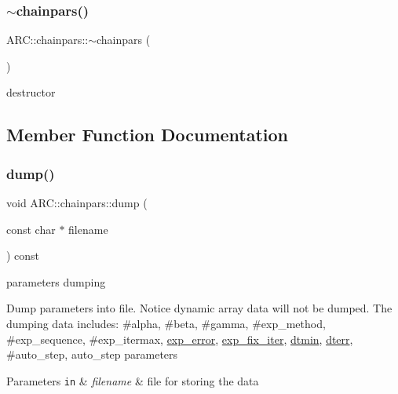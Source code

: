 \subsubsection{\texorpdfstring{$\sim$chainpars()}{~chainpars()}}
{\footnotesize\ttfamily A\+R\+C\+::chainpars\+::$\sim$chainpars (\begin{DoxyParamCaption}{ }\end{DoxyParamCaption})\hspace{0.3cm}{\ttfamily [inline]}}



destructor 



\subsection{Member Function Documentation}
\hypertarget{classARC_1_1chainpars_a926438a652307d24bd8a03b0ca926382}{}\label{classARC_1_1chainpars_a926438a652307d24bd8a03b0ca926382} 
\subsubsection{\texorpdfstring{dump()}{dump()}}
{\footnotesize\ttfamily void A\+R\+C\+::chainpars\+::dump (\begin{DoxyParamCaption}\item[{const char $\ast$}]{filename }\end{DoxyParamCaption}) const\hspace{0.3cm}{\ttfamily [inline]}}



parameters dumping 

Dump parameters into file. Notice dynamic array data will not be dumped. The dumping data includes\+: \#alpha, \#beta, \#gamma, \#exp\+\_\+method, \#exp\+\_\+sequence, \#exp\+\_\+itermax, \hyperlink{classARC_1_1chainpars_a7ee477ebe8b1d67457891ab58560c074}{exp\+\_\+error}, \hyperlink{classARC_1_1chainpars_a3f16e6ea9497e294265c4a17df0394ba}{exp\+\_\+fix\+\_\+iter}, \hyperlink{classARC_1_1chainpars_ac414014d19915aecb35245ba11649c2e}{dtmin}, \hyperlink{classARC_1_1chainpars_ad3a3e8f9199180ec82b9c257b1e8570e}{dterr}, \#auto\+\_\+step, auto\+\_\+step parameters 
\begin{DoxyParams}[1]{Parameters}
\mbox{\tt in}  & {\em filename} & file for storing the data \\
\hline
\end{DoxyParams}
\hypertarget{classARC_1_1chainpars_ad294bf8a2f7f5a20e554d4a9cb2c3e4c}{}\label{classARC_1_1chainpars_ad294bf8a2f7f5a20e554d4a9cb2c3e4c} 
